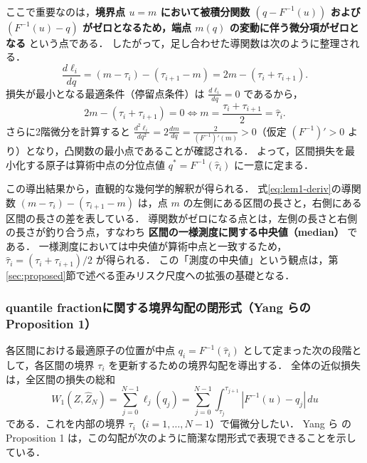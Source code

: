 \documentclass[a4paper,10pt]{jsarticle}
\makeatletter
\theoremstyle{definition}
\renewenvironment{proof}[1][\proofname]{\par
  \pushQED{\qed}%
  \normalfont \topsep6\p@\@plus6\p@\relax
  \trivlist
  \item[\hskip\labelsep\textbf{#1}]\ignorespaces
}{%
  \popQED\endtrivlist\@endpefalse
}
\renewcommand{\proofname}{証明}
\newcommand{\Wone}{W_1}
\renewcommand{\Finv}{F^{-1}}
\makeatother
\begin{document}
\begin{proof}
\begin{align}
\end{align}
ここで重要なのは，\textbf{境界点 $u=m$ において被積分関数 $(q - \Finv(u))$ および $(\Finv(u) - q)$ がゼロとなるため，端点 $m(q)$ の変動に伴う微分項がゼロとなる} という点である．
したがって，足し合わせた導関数は次のように整理される．
\begin{equation}
  \frac{d\ell_i}{dq} = (m - \tau_i) - (\tau_{i+1} - m) = 2m - (\tau_i + \tau_{i+1}).
  \label{eq:lem1-deriv}
\end{equation}
損失が最小となる最適条件（停留点条件）は $\frac{d\ell_i}{dq} = 0$ であるから，
\begin{equation}
  2m - (\tau_i + \tau_{i+1}) = 0 \iff m = \frac{\tau_i + \tau_{i+1}}{2} = \hat\tau_i.
\end{equation}
さらに2階微分を計算すると $\frac{d^2\ell_i}{dq^2} = 2 \frac{dm}{dq} = \frac{2}{(\Finv)'(m)} > 0$（仮定 $(\Finv)'>0$ より）となり，凸関数の最小点であることが確認される．
よって，区間損失を最小化する原子は算術中点の分位点値 $q^* = \Finv(\hat\tau_i)$ に一意に定まる．
\end{proof}

この導出結果から，直観的な幾何学的解釈が得られる．
式\eqref{eq:lem1-deriv}の導関数 $(m - \tau_i) - (\tau_{i+1} - m)$ は，点 $m$ の左側にある区間の長さと，右側にある区間の長さの差を表している．
導関数がゼロになる点とは，左側の長さと右側の長さが釣り合う点，すなわち \textbf{区間の一様測度に関する中央値（median）} である．
一様測度においては中央値が算術中点と一致するため，$\hat\tau_i = (\tau_i+\tau_{i+1})/2$ が得られる．
この「測度の中央値」という観点は，第\ref{sec:proposed}節で述べる歪みリスク尺度への拡張の基礎となる．

\subsubsection{quantile fractionに関する境界勾配の閉形式（Yang らの Proposition 1）}
各区間における最適原子の位置が中点 $q_i = \Finv(\hat\tau_i)$ として定まった次の段階として，各区間の境界 $\tau_i$ を更新するための境界勾配を導出する．
全体の近似損失は，全区間の損失の総和
\begin{equation}
  \Wone(Z, \hat Z_N) = \sum_{j=0}^{N-1} \ell_j(q_j) = \sum_{j=0}^{N-1} \int_{\tau_j}^{\tau_{j+1}} |\Finv(u) - q_j|\,du
  \label{eq:total-w1}
\end{equation}
である．これを内部の境界 $\tau_i$（$i=1,\dots,N-1$）で偏微分したい．
Yang ら \cite{yang2019fqf} の Proposition 1 は，この勾配が次のように簡潔な閉形式で表現できることを示している．
\end{document}
